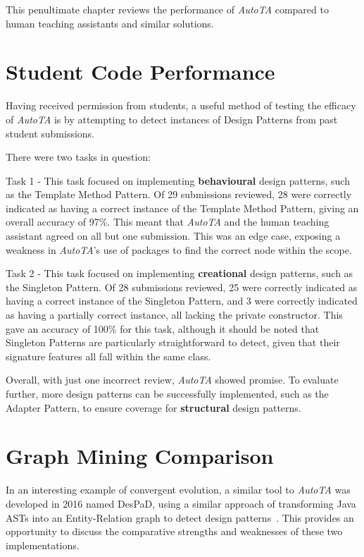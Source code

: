 \label{chapter:evaluation}
This penultimate chapter reviews the performance of \emph{AutoTA} compared to human teaching assistants and similar solutions.

\section{Student Code Performance}
Having received permission from students, a useful method of testing the efficacy of \emph{AutoTA} is by attempting to detect instances of Design Patterns from past student submissions.

There were two tasks in question:

Task 1 - This task focused on implementing \textbf{behavioural} design patterns, such as the Template Method Pattern. Of 29 submissions reviewed, 28 were correctly indicated as having a correct instance of the Template Method Pattern, giving an overall accuracy of 97\%. This meant that \emph{AutoTA} and the human teaching assistant agreed on all but one submission. This was an edge case, exposing a weakness in \emph{AutoTA}'s use of packages to find the correct node within the scope.

Task 2 - This task focused on implementing \textbf{creational} design patterns, such as the Singleton Pattern. Of 28 submissions reviewed, 25 were correctly indicated as having a correct instance of the Singleton Pattern, and 3 were correctly indicated as having a partially correct instance, all lacking the private constructor. This gave an accuracy of 100\% for this task, although it should be noted that Singleton Patterns are particularly straightforward to detect, given that their signature features all fall within the same class.

Overall, with just one incorrect review, \emph{AutoTA} showed promise. To evaluate further, more design patterns can be successfully implemented, such as the Adapter Pattern, to ensure coverage for \textbf{structural} design patterns.

\section{Graph Mining Comparison}
In an interesting example of convergent evolution, a similar tool to \emph{AutoTA} was developed in 2016 named DesPaD, using a similar approach of transforming Java ASTs into an Entity-Relation graph to detect design patterns~\cite{DESPAD}. This provides an opportunity to discuss the comparative strengths and weaknesses of these two implementations.

